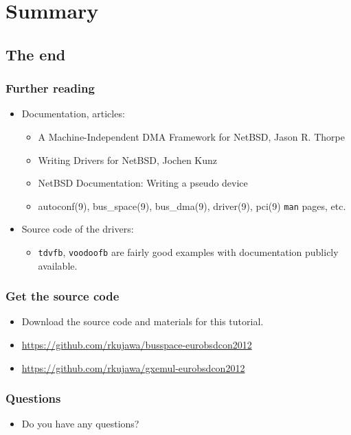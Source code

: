 \documentclass[dvipsnames,table]{beamer}
\begin{document}
\section{Summary}
\subsection{The end}

\begin{frame}
\frametitle{Further reading}
\begin{itemize}
	\item Documentation, articles:
	\begin{itemize}
		\item A Machine-Independent DMA Framework for NetBSD, Jason R. Thorpe
		\item Writing Drivers for NetBSD, Jochen Kunz
		\item NetBSD Documentation: Writing a pseudo device
		\item autoconf(9), bus\_space(9), bus\_dma(9), driver(9), pci(9) {\tt man} pages, etc.
	\end{itemize}
	\item Source code of the drivers:
	\begin{itemize}
		\item {\tt tdvfb}, {\tt voodoofb} are fairly good examples with documentation publicly available.
	\end{itemize}
\end{itemize}

\end{frame}

\begin{frame}
\frametitle{Get the source code}

\begin{itemize}
	\item Download the source code and materials for this tutorial.
	\item {\small\url{https://github.com/rkujawa/busspace-eurobsdcon2012}}
	\item {\small\url{https://github.com/rkujawa/gxemul-eurobsdcon2012}}
\end{itemize}
\end{frame}


\begin{frame}
\frametitle{Questions}

\begin{itemize}
	\item Do you have any questions?
\end{itemize}
\end{frame}
\end{document}
